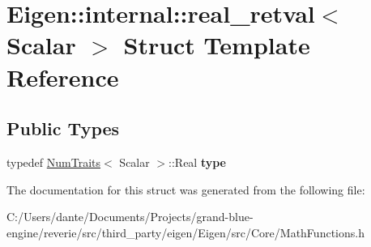 \hypertarget{struct_eigen_1_1internal_1_1real__retval}{}\section{Eigen\+::internal\+::real\+\_\+retval$<$ Scalar $>$ Struct Template Reference}
\label{struct_eigen_1_1internal_1_1real__retval}
\subsection*{Public Types}
\begin{DoxyCompactItemize}
\item 
\mbox{\label{struct_eigen_1_1internal_1_1real__retval_aecd11e079a46f774c6c2a40ce525b3d2}} 
typedef \mbox{\hyperlink{struct_eigen_1_1_num_traits}{Num\+Traits}}$<$ Scalar $>$\+::Real {\bfseries type}
\end{DoxyCompactItemize}


The documentation for this struct was generated from the following file\+:\begin{DoxyCompactItemize}
\item 
C\+:/\+Users/dante/\+Documents/\+Projects/grand-\/blue-\/engine/reverie/src/third\+\_\+party/eigen/\+Eigen/src/\+Core/Math\+Functions.\+h\end{DoxyCompactItemize}

